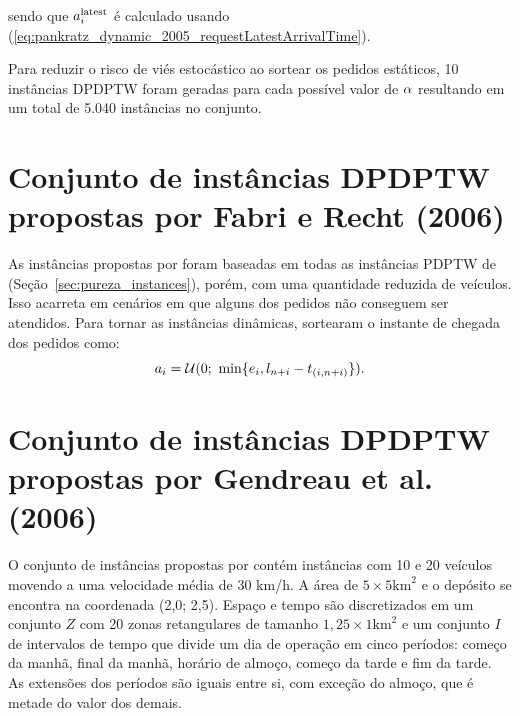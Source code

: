\noindent sendo que $a{}_{i{}}^{\mathrm{latest}}$ é calculado usando
(\ref{eq:pankratz_dynamic_2005_requestLatestArrivalTime}).

Para reduzir o risco de viés estocástico ao sortear os pedidos estáticos, 10 
instâncias DPDPTW foram geradas para cada possível valor de $\alpha$
resultando em um total de 5.040 instâncias no conjunto.






\section{Conjunto de instâncias DPDPTW propostas por 
         Fabri e Recht (2006)}

As instâncias propostas por \textcite{fabri_dynamic_2006} foram baseadas em
todas as instâncias PDPTW de \textcite{li_metaheuristic_2003} 
(Seção~\ref{sec:pureza_instances}), porém, com uma quantidade reduzida de 
veículos.
Isso acarreta em cenários em que alguns dos pedidos não conseguem ser 
atendidos.
Para tornar as instâncias dinâmicas, \textcite{fabri_dynamic_2006} sortearam 
o instante de chegada dos pedidos como:
%
\begin{equation}
  a_{i} = 
  \mathcal{U}(0;\ \min\{e_i, 
      l_{n + i} 
  - t_{(i,n + i)}\}).
  \label{eq:fabri_dynamic_2006_requestArrivalTime}
\end{equation}







\section{Conjunto de instâncias DPDPTW propostas por 
         Gendreau et al. (2006)} 
\label{sec:gendreau_instances}

O conjunto de instâncias propostas por \textcite{gendreau_neighborhood_2006}
contém instâncias com 10 e 20 veículos movendo a uma velocidade média de 30 
km/h. 
A área de $5 \times 5 \text{km}^2$  e o depósito se encontra na coordenada 
(2,0; 2,5). 
Espaço e tempo são discretizados em um conjunto $Z$ com 20 zonas retangulares 
de tamanho $1,25 \times 1 \text{km}^2$ e um conjunto $I$ de intervalos de tempo
que divide um dia de operação em cinco períodos: começo da manhã, final da 
manhã, horário de almoço, começo da tarde e fim da tarde.
As extensões dos períodos são iguais entre si, com exceção do almoço, que é
metade do valor dos demais.

